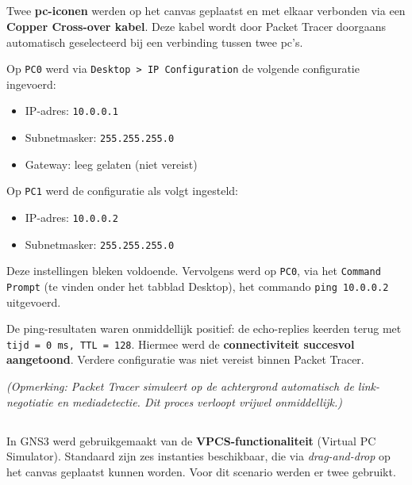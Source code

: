\subsection{}
Twee \textbf{pc-iconen} werden op het canvas geplaatst en met elkaar verbonden via een \textbf{Copper Cross-over kabel}. Deze kabel wordt door Packet Tracer doorgaans automatisch geselecteerd bij een verbinding tussen twee pc’s.

Op \texttt{PC0} werd via \texttt{Desktop > IP Configuration} de volgende configuratie ingevoerd:
\begin{itemize}
    \item IP-adres: \texttt{10.0.0.1}
    \item Subnetmasker: \texttt{255.255.255.0}
    \item Gateway: leeg gelaten (niet vereist)
\end{itemize}

Op \texttt{PC1} werd de configuratie als volgt ingesteld:
\begin{itemize}
    \item IP-adres: \texttt{10.0.0.2}
    \item Subnetmasker: \texttt{255.255.255.0}
\end{itemize}

Deze instellingen bleken voldoende. Vervolgens werd op \texttt{PC0}, via het \texttt{Command Prompt} (te vinden onder het tabblad Desktop), het commando \texttt{ping 10.0.0.2} uitgevoerd.

De ping-resultaten waren onmiddellijk positief: de echo-replies keerden terug met \texttt{tijd = 0 ms, TTL = 128}. Hiermee werd de \textbf{connectiviteit succesvol aangetoond}. Verdere configuratie was niet vereist binnen Packet Tracer.

\textit{(Opmerking: Packet Tracer simuleert op de achtergrond automatisch de link-negotiatie en mediadetectie. Dit proces verloopt vrijwel onmiddellijk.)}

\subsection{}

In GNS3 werd gebruikgemaakt van de \textbf{VPCS-functionaliteit} (Virtual PC Simulator). Standaard zijn zes instanties beschikbaar, die via \textit{drag-and-drop} op het canvas geplaatst kunnen worden. Voor dit scenario werden er twee gebruikt.

